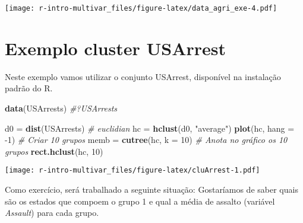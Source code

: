 \documentclass[]{book}
\newenvironment{Shaded}{\begin{snugshade}}{\end{snugshade}}
\newcommand{\KeywordTok}[1]{\textcolor[rgb]{0.13,0.29,0.53}{\textbf{{#1}}}}
\newcommand{\DataTypeTok}[1]{\textcolor[rgb]{0.13,0.29,0.53}{{#1}}}
\newcommand{\DecValTok}[1]{\textcolor[rgb]{0.00,0.00,0.81}{{#1}}}
\newcommand{\StringTok}[1]{\textcolor[rgb]{0.31,0.60,0.02}{{#1}}}
\newcommand{\CommentTok}[1]{\textcolor[rgb]{0.56,0.35,0.01}{\textit{{#1}}}}
\newcommand{\NormalTok}[1]{{#1}}
\begin{document}
\texttt{[image: r-intro-multivar\_files/figure-latex/data\_agri\_exe-4.pdf]}

\section{Exemplo cluster USArrest}\label{exemplo-cluster-usarrest}

Neste exemplo vamos utilizar o conjunto USArrest, disponível na
instalação padrão do R.

\begin{Shaded}
\begin{Highlighting}[]
\KeywordTok{data}\NormalTok{(USArrests)}
\CommentTok{#?USArrests}

\NormalTok{d0 =}\StringTok{ }\KeywordTok{dist}\NormalTok{(USArrests) }\CommentTok{# euclidian}
\NormalTok{hc =}\StringTok{ }\KeywordTok{hclust}\NormalTok{(d0, }\StringTok{"average"}\NormalTok{)}
\KeywordTok{plot}\NormalTok{(hc, }\DataTypeTok{hang =} \NormalTok{-}\DecValTok{1}\NormalTok{)}
\CommentTok{# Criar 10 grupos}
\NormalTok{memb =}\StringTok{ }\KeywordTok{cutree}\NormalTok{(hc, }\DataTypeTok{k =} \DecValTok{10}\NormalTok{)}
\CommentTok{# Anota no gráfico os 10 grupos}
\KeywordTok{rect.hclust}\NormalTok{(hc, }\DecValTok{10}\NormalTok{)}
\end{Highlighting}
\end{Shaded}

\texttt{[image: r-intro-multivar\_files/figure-latex/cluArrest-1.pdf]}

Como exercício, será trabalhado a seguinte situação: Gostaríamos de
saber quais são os estados que compoem o grupo 1 e qual a média de
assalto (variável \emph{Assault}) para cada grupo.

\begin{Shaded}
\end{Shaded}
\end{document}
